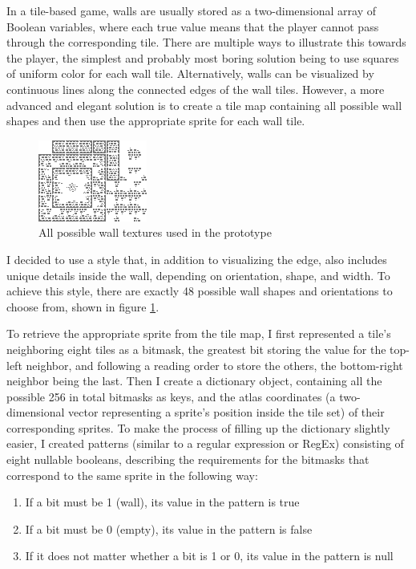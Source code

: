 In a tile-based game, walls are usually stored as a two-dimensional array of Boolean variables, where each true value means that the player cannot pass through the corresponding tile. There are multiple ways to illustrate this towards the player, the simplest and probably most boring solution being to use squares of uniform color for each wall tile. Alternatively, walls can be visualized by continuous lines along the connected edges of the wall tiles. However, a more advanced and elegant solution is to create a tile map containing all possible wall shapes and then use the appropriate sprite for each wall tile.

\begin{figure}[h]
    \centering
    \includegraphics{images/walls.png} 
    \caption{All possible wall textures used in the prototype}
    \label{figure:walls}
\end{figure}

I decided to use a style that, in addition to visualizing the edge, also includes unique details inside the wall, depending on orientation, shape, and width. To achieve this style, there are exactly 48 possible wall shapes and orientations to choose from, shown in figure \ref{figure:walls}.

To retrieve the appropriate sprite from the tile map, I first represented a tile's neighboring eight tiles as a bitmask, the greatest bit storing the value for the top-left neighbor, and following a reading order to store the others, the bottom-right neighbor being the last. Then I create a dictionary object, containing all the possible 256 in total bitmasks as keys, and the atlas coordinates (a two-dimensional vector representing a sprite's position inside the tile set) of their corresponding sprites. To make the process of filling up the dictionary slightly easier, I created patterns (similar to a regular expression or RegEx) consisting of eight nullable booleans, describing the requirements for the bitmasks that correspond to the same sprite in the following way:

\begin{enumerate}
  \item If a bit must be 1 (wall), its value in the pattern is true
  \item If a bit must be 0 (empty), its value in the pattern is false
  \item If it does not matter whether a bit is 1 or 0, its value in the pattern is null
\end{enumerate}

